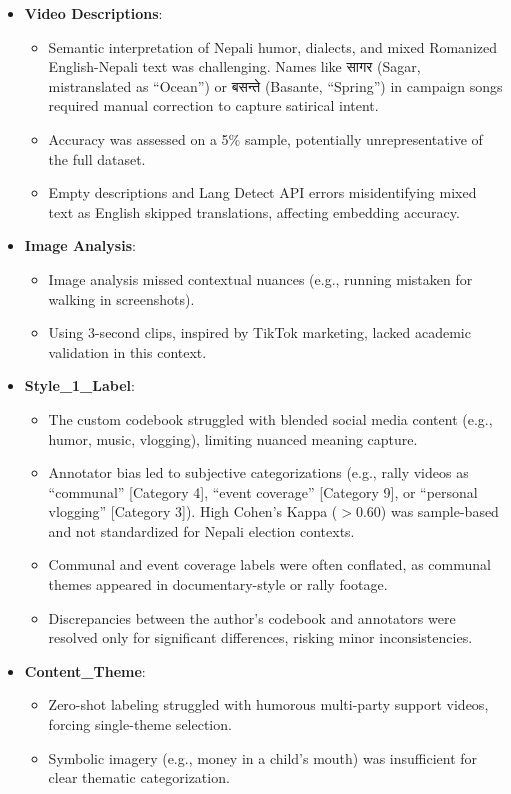 \documentclass[12pt,a4paper]{report}
\begin{document}
\begin{itemize}
    \item \textbf{Video Descriptions}:
        \begin{itemize}
            \item Semantic interpretation of Nepali humor, dialects, and mixed Romanized English-Nepali text was challenging. Names like \texthindi{सागर} (Sagar, mistranslated as ``Ocean'') or \texthindi{बसन्ते} (Basante, ``Spring'') in campaign songs required manual correction to capture satirical intent.
            \item Accuracy was assessed on a 5\% sample, potentially unrepresentative of the full dataset.
            \item Empty descriptions and Lang Detect API errors misidentifying mixed text as English skipped translations, affecting embedding accuracy.
        \end{itemize}
\newpage
    \item \textbf{Image Analysis}:
        \begin{itemize}
            \item Image analysis missed contextual nuances (e.g., running mistaken for walking in screenshots).
            \item Using 3-second clips, inspired by TikTok marketing, lacked academic validation in this context.
        \end{itemize}

    \item \textbf{Style\_1\_Label}:
        \begin{itemize}
            \item The custom codebook struggled with blended social media content (e.g., humor, music, vlogging), limiting nuanced meaning capture.
            \item Annotator bias led to subjective categorizations (e.g., rally videos as ``communal'' [Category 4], ``event coverage'' [Category 9], or ``personal vlogging'' [Category 3]). High Cohen’s Kappa ($>0.60$) was sample-based and not standardized for Nepali election contexts.
            \item Communal and event coverage labels were often conflated, as communal themes appeared in documentary-style or rally footage.
            \item Discrepancies between the author’s codebook and annotators were resolved only for significant differences, risking minor inconsistencies.
        \end{itemize}

    \item \textbf{Content\_Theme}:
        \begin{itemize}
            \item Zero-shot labeling struggled with humorous multi-party support videos, forcing single-theme selection.
            \item Symbolic imagery (e.g., money in a child’s mouth) was insufficient for clear thematic categorization.
        \end{itemize}


\end{itemize}
\end{document}
